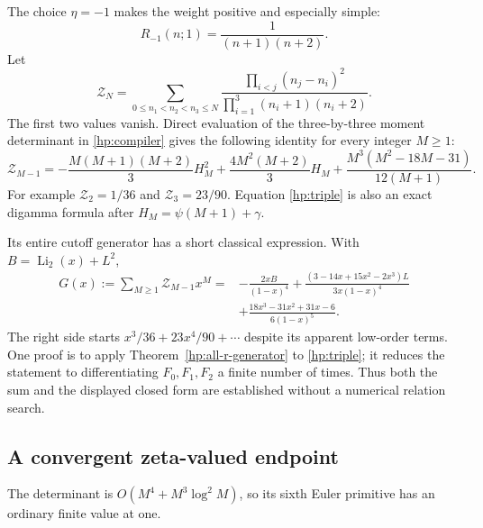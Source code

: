 \documentclass[11pt,a4paper]{article}
\theoremstyle{definition}
\theoremstyle{remark}
\numberwithin{equation}{section}
\begin{document}
The choice $\eta=-1$ makes the weight positive and especially
simple:
\[
 R_{-1}(n;1)=\frac1{(n+1)(n+2)}.
\]
Let
\[
 \mathcal Z_N=
 \sum_{0\le n_1<n_2<n_3\le N}
   \frac{\prod_{i<j}(n_j-n_i)^2}
        {\prod_{i=1}^3(n_i+1)(n_i+2)}.
\]
The first two values vanish. Direct evaluation of the three-by-three
moment determinant in \eqref{hp:compiler} gives the following identity
for every integer $M\ge1$:
\begin{equation}\label{hp:triple}
 \boxed{\displaystyle
 \mathcal Z_{M-1}
 =-\frac{M(M+1)(M+2)}3H_M^2
   +\frac{4M^2(M+2)}3H_M
   +\frac{M^3(M^2-18M-31)}{12(M+1)}.}
\end{equation}
For example $\mathcal Z_2=1/36$ and $\mathcal Z_3=23/90$.
Equation \eqref{hp:triple} is also an exact digamma formula
after $H_M=\psi(M+1)+\gamma$.

Its entire cutoff generator has a short classical expression.
With $B=\operatorname{Li}_2(x)+L^2$,
\begin{equation}\label{hp:triple-generator}
 \boxed{\begin{aligned}
 G(x):=\sum_{M\ge1}\mathcal Z_{M-1}x^M
 ={}&-\frac{2xB}{(1-x)^4}
  +\frac{(3-14x+15x^2-2x^3)L}{3x(1-x)^4}\\
 &+\frac{18x^3-31x^2+31x-6}{6(1-x)^5}.
 \end{aligned}}
\end{equation}
The right side starts $x^3/36+23x^4/90+\cdots$ despite its
apparent low-order terms. One proof is to apply
Theorem~\ref{hp:all-r-generator} to \eqref{hp:triple}; it reduces
the statement to differentiating $F_0,F_1,F_2$ a finite number
of times. Thus both the sum and the displayed closed form
are established without a numerical relation search.

\subsection{A convergent zeta-valued endpoint}

The determinant is $O(M^4+M^3\log^2 M)$, so its sixth Euler
primitive has an ordinary finite value at one.
\end{document}

